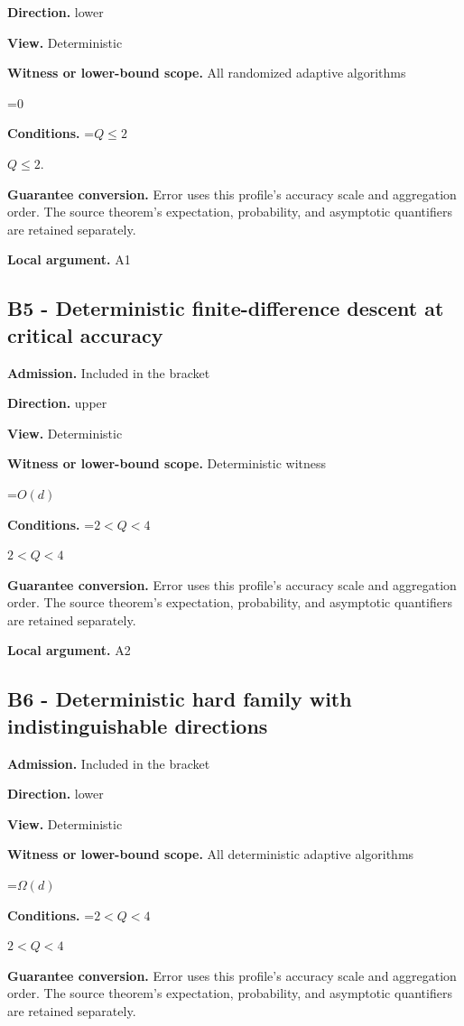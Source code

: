 \documentclass[10pt,a4paper]{article}
\newcommand{\AtlasMath}[1]{\par\begingroup\centering\setbox0=\hbox{$\displaystyle #1$}\ifdim\wd0>1.4\linewidth\typeout{ATLAS WIDE FORMULA: \the\wd0}\fi\ifdim\wd0>\linewidth\resizebox{\linewidth}{!}{\box0}\else\box0\fi\par\endgroup}
\newcommand{\AtlasInlineMath}[1]{\begingroup\setbox0=\hbox{$#1$}\ifdim\wd0>.4\linewidth\endgroup\AtlasMath{#1}\else\endgroup$#1$\fi}
\begin{document}
\textbf{Direction.} lower

\textbf{View.} Deterministic

\textbf{Witness or lower-bound scope.} All randomized adaptive algorithms

\AtlasMath{0}
\textbf{Conditions.} \AtlasInlineMath{Q\le2}.

\textbf{Guarantee conversion.} Error uses this profile's accuracy scale and aggregation order. The source theorem's expectation, probability, and asymptotic quantifiers are retained separately.

\textbf{Local argument.} A1

\subsection{B5 - Deterministic finite-difference descent at critical accuracy}
\textbf{Admission.} Included in the bracket

\textbf{Direction.} upper

\textbf{View.} Deterministic

\textbf{Witness or lower-bound scope.} Deterministic witness

\AtlasMath{O(d)}
\textbf{Conditions.} \AtlasInlineMath{2<Q<4}

\textbf{Guarantee conversion.} Error uses this profile's accuracy scale and aggregation order. The source theorem's expectation, probability, and asymptotic quantifiers are retained separately.

\textbf{Local argument.} A2

\subsection{B6 - Deterministic hard family with indistinguishable directions}
\textbf{Admission.} Included in the bracket

\textbf{Direction.} lower

\textbf{View.} Deterministic

\textbf{Witness or lower-bound scope.} All deterministic adaptive algorithms

\AtlasMath{\Omega(d)}
\textbf{Conditions.} \AtlasInlineMath{2<Q<4}

\textbf{Guarantee conversion.} Error uses this profile's accuracy scale and aggregation order. The source theorem's expectation, probability, and asymptotic quantifiers are retained separately.
\end{document}
